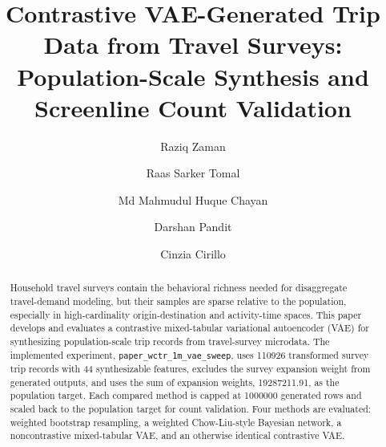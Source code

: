 \documentclass[3p,times,procedia]{elsarticle}
\begin{document}
\begin{frontmatter}


\title{Contrastive VAE-Generated Trip Data from Travel Surveys: Population-Scale Synthesis and Screenline Count Validation}

\author[a]{Raziq Zaman}
\author[a]{Raas Sarker Tomal}
\author[a]{Md Mahmudul Huque Chayan}
\author[a]{Darshan Pandit}
\author[a]{Cinzia Cirillo}

\address[a]{Department of Civil and Environmental Engineering, University of Maryland}

\begin{abstract}
Household travel surveys contain the behavioral richness needed for disaggregate travel-demand modeling, but their samples are sparse relative to the population, especially in high-cardinality origin-destination and activity-time spaces. This paper develops and evaluates a contrastive mixed-tabular variational autoencoder (VAE) for synthesizing population-scale trip records from travel-survey microdata. The implemented experiment, \texttt{paper\_wctr\_1m\_vae\_sweep}, uses \num{110926} transformed survey trip records with \num{44} synthesizable features, excludes the survey expansion weight from generated outputs, and uses the sum of expansion weights, \num{19287211.91}, as the population target. Each compared method is capped at \num{1000000} generated rows and scaled back to the population target for count validation. Four methods are evaluated: weighted bootstrap resampling, a weighted Chow-Liu-style Bayesian network, a noncontrastive mixed-tabular VAE, and an otherwise identical contrastive VAE.


\end{abstract}
\end{frontmatter}
\end{document}
